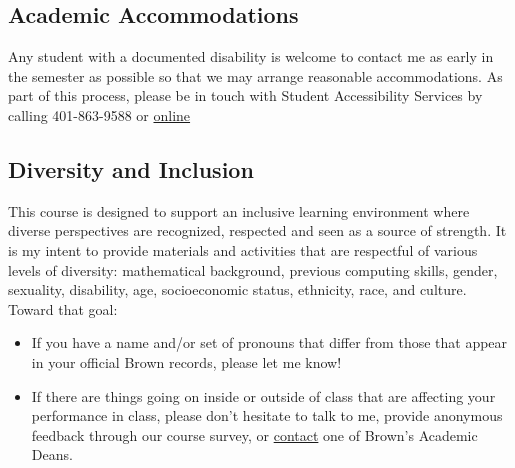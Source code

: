 \subsection{Academic Accommodations}
Any student with a documented disability is welcome to contact me as early in the semester as possible so that we may arrange reasonable accommodations. As part of this process, please be in touch with Student Accessibility Services by calling 401-863-9588 or \href{http://brown.edu/Student_Services/Office_of_Student_Life/seas/index.html}{online}

\subsection{Diversity and Inclusion}

This course is designed to support an inclusive learning environment where diverse perspectives are recognized, respected and seen as a source of strength. It is my intent to provide materials and activities that are respectful of various levels of diversity: mathematical background, previous computing skills, gender, sexuality, disability, age, socioeconomic status, ethnicity, race, and culture. Toward that goal:

\begin{itemize}
\item If you have a name and/or set of pronouns that differ from those that appear in your official Brown records, please let me know!
\item If there are things going on inside or outside of class that are affecting your performance in class, please don't hesitate to talk to me, provide anonymous feedback through our course survey, or \href{https://www.brown.edu/academics/college/speak-academic-dean}{contact} one of Brown's Academic Deans.
\end{itemize}
